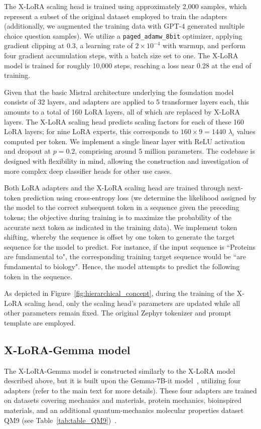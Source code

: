 The X-LoRA scaling head is trained using approximately 2,000 samples, which represent a subset of the original dataset employed to train the adapters (additionally, we augmented the training data with GPT-4 generated multiple choice question samples). We utilize a \texttt{paged\_adamw\_8bit} optimizer, applying gradient clipping at 0.3, a learning rate of $2\times 10^{-4}$ with warmup, and perform four gradient accumulation steps, with a batch size set to one. The X-LoRA model is trained for roughly 10,000 steps, reaching a loss near 0.28 at the end of training.

Given that the basic Mistral architecture underlying the foundation model consists of 32 layers, and adapters are applied to 5 transformer layers each, this amounts to a total of 160 LoRA layers, all of which are replaced by X-LoRA layers. The X-LoRA scaling head predicts scaling factors for each of these 160 LoRA layers; for nine LoRA experts, this corresponds to $160 \times 9 = 1440$ $\lambda_i$ values computed per token. We implement a single linear layer with ReLU activation and dropout at $p=0.2$, comprising around 5 million parameters. The codebase is designed with flexibility in mind, allowing the construction and investigation of more complex deep classifier heads for other use cases.

Both LoRA adapters and the X-LoRA scaling head are trained through next-token prediction using cross-entropy loss (we determine the likelihood assigned by the model to the correct subsequent token in a sequence given the preceding tokens; the objective during training is to maximize the probability of the accurate next token as indicated in the training data). We implement token shifting, whereby the sequence is offset by one token to generate the target sequence for the model to predict. For instance, if the input sequence is ``Proteins are fundamental to", the corresponding training target sequence would be ``are fundamental to biology". Hence, the model attempts to predict the following token in the sequence.

As depicted in Figure~\ref{fig:hierarchical_concept}, during the training of the X-LoRA scaling head, only the scaling head’s parameters are updated while all other parameters remain fixed. The original Zephyr tokenizer and prompt template are employed.

\subsection{X-LoRA-Gemma model} The X-LoRA-Gemma model is constructed similarly to the X-LoRA model described above, but it is built upon the Gemma-7B-it model~\cite{Google/gemma-7b-itFace}, utilizing four adapters (refer to the main text for more details). These four adapters are trained on datasets covering mechanics and materials, protein mechanics, bioinspired materials, and an additional quantum-mechanics molecular properties dataset QM9 (see Table~\ref{tab:table_QM9})~\cite{Ruddigkeit2012EnumerationGDB-17,Ramakrishnan2015ElectronicSpace}.

